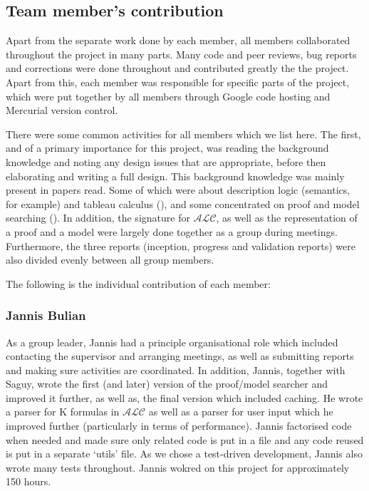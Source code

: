 \subsection{Team member's contribution}

Apart from the separate work done by each member, all members collaborated throughout the project in many parts. Many code and peer reviews, bug reports and corrections were done
throughout and contributed greatly the the project. Apart from this, each member was responsible for specific parts of the project, which were put together by all members through Google code hosting and Mercurial version control. 

There were some common activities for all members which we list here. The first, and of a primary importance for this project, was reading the background knowledge and noting any design issues that are appropriate, before then elaborating and writing a full design. This background knowledge was mainly present in papers read. Some of which were about description logic (semantics, for example) and tableau calculus (\cite{baadernutt02,gore99}), and some concentrated on proof and model searching (\cite{Gore:2010:OTA,gore07}). In addition, the signature for $\mathcal{ALC}$, as well as the representation of a proof and a model were largely done together as a group during meetings. Furthermore, the three reports (inception, progress and validation reports) were also divided evenly between all group members.

The following is the individual contribution of each member:

\subsubsection*{Jannis Bulian}

As a group leader, Jannis had a principle organisational role which included contacting the supervisor and arranging meetings, as well as submitting reports and making sure activities are coordinated. In addition, Jannis, together with Saguy, wrote the first (and later) version of the proof/model searcher and improved it further, as well as, the final version which included caching. He wrote a parser for K formulas in $\mathcal{ALC}$ as well as a parser for user input which he improved further (particularly in terms of performance). Jannis factorised code when needed and made sure only related code is put in a file and any code reused is put in a separate `utils' file. As we chose a test-driven development, Jannis also wrote many tests throughout. Jannis wokred on this project for approximately 150 hours. 

